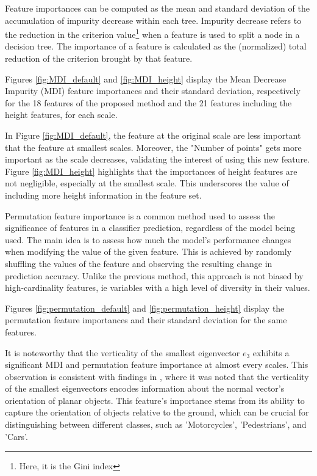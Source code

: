 \documentclass{article}
\begin{document}
Feature importances can be computed as the mean and standard deviation of the accumulation of impurity decrease within each tree. Impurity decrease refers to the reduction in the criterion value\footnote{Here, it is the Gini index} when a feature is used to split a node in a decision tree. The importance of a feature is calculated as the (normalized) total reduction of the criterion brought by that feature.

Figures \ref{fig:MDI_default} and \ref{fig:MDI_height} display the Mean Decrease Impurity (MDI) feature importances and their standard deviation, respectively for the 18 features of the proposed method \cite{thomas_semantic_2018} and the 21 features including the height features, for each scale. 

In Figure \ref{fig:MDI_default}, the feature at the original scale are less important that the feature at smallest scales. Moreover, the "Number of points" gets more important as the scale decreases, validating the interest of using this new feature. Figure \ref{fig:MDI_height} highlights that the importances of height features are not negligible, especially at the smallest scale. This underscores the value of including more height information in the feature set. 

Permutation feature importance is a common method used to assess the significance of features in a classifier prediction, regardless of the model being used. The main idea is to assess how much the model's performance changes when modifying the value of the given feature. This is achieved by randomly shuffling the values of the feature and observing the resulting change in prediction accuracy.
Unlike the previous method, this approach is not biased by high-cardinality features, ie variables with a high level of diversity in their values.

Figures \ref{fig:permutation_default} and \ref{fig:permutation_height} display the permutation feature importances and their standard deviation for the same features. 

It is noteworthy that the verticality of the smallest eigenvector $e_3$ exhibits a significant MDI and permutation feature importance at almost every scales. This observation is consistent with findings in \cite{thomas_semantic_2018}, where it was noted that the verticality of the smallest eigenvectors encodes information about the normal vector's orientation of planar objects. This feature's importance stems from its ability to capture the orientation of objects relative to the ground, which can be crucial for distinguishing between different classes, such as 'Motorcycles', 'Pedestrians', and 'Cars'.
\end{document}
